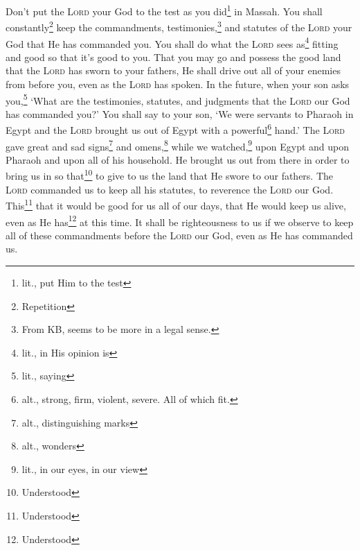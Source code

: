 \begin{inparaenum}
     Don't put the \textsc{Lord} your God to the test as you did\footnote{lit., put Him to the test} in Massah.%
     You shall constantly\footnote{Repetition} keep the commandments, testimonies,\footnote{From KB, seems to be more in a legal sense.} and statutes of the \textsc{Lord} your God that He has commanded you.%
     You shall do what the \textsc{Lord} sees as\footnote{lit., in His opinion is} fitting and good so that it's good to you. That you may go and possess the good land that the \textsc{Lord} has sworn to your fathers,%
     He shall drive out all of your enemies from before you, even as the \textsc{Lord} has spoken.%
     In the future, when your son asks you,\footnote{lit., saying} `What are the testimonies, statutes, and judgments that the \textsc{Lord} our God has commanded you?'%
     You shall say to your son, `We were servants to Pharaoh in Egypt and the \textsc{Lord} brought us out of Egypt with a powerful\footnote{alt., strong, firm, violent, severe. All of which fit.} hand.'%
     The \textsc{Lord} gave great and sad signs\footnote{alt., distinguishing marks} and omens,\footnote{alt., wonders} while we watched,\footnote{lit., in our eyes, in our view} upon Egypt and upon Pharaoh and upon all of his household.%
     He brought us out from there in order to bring us in so that\footnote{Understood} to give to us the land that He swore to our fathers.%
     The \textsc{Lord} commanded us to keep all his statutes, to reverence the \textsc{Lord} our God. This\footnote{Understood} that it would be good for us all of our days, that He would keep us alive, even as He has\footnote{Understood} at this time.%
     It shall be righteousness to us if we observe to keep all of these commandments before the \textsc{Lord} our God, even as He has commanded us.%
\end{inparaenum}
